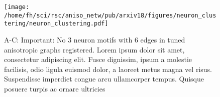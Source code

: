 

\begin{figure}[h!]
  \centering
\texttt{[image: /home/fh/sci/rsc/aniso\_netw/pub/arxiv18/figures/neuron\_clustering/neuron\_clustering.pdf]}
\caption{A-C: Important: No 3 neuron motifs with 6 edges in tuned anisotropic
graphs registered. Lorem ipsum dolor sit amet, consectetur adipiscing elit. Fusce dignissim, ipsum a molestie facilisis, odio ligula euismod dolor, a laoreet metus magna vel risus. Suspendisse imperdiet congue arcu ullamcorper tempus. Quisque posuere turpis ac ornare ultricies}
\label{fig_cluster}%
\end{figure}


\newpage

